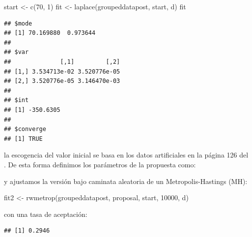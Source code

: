 \documentclass[
  12pt,
]{book}
\newenvironment{Shaded}{\begin{snugshade}}{\end{snugshade}}
\newcommand{\AttributeTok}[1]{\textcolor[rgb]{0.77,0.63,0.00}{#1}}
\newcommand{\DecValTok}[1]{\textcolor[rgb]{0.00,0.00,0.81}{#1}}
\newcommand{\FunctionTok}[1]{\textcolor[rgb]{0.00,0.00,0.00}{#1}}
\newcommand{\NormalTok}[1]{#1}
\newcommand{\OtherTok}[1]{\textcolor[rgb]{0.56,0.35,0.01}{#1}}
\newcommand{\SpecialCharTok}[1]{\textcolor[rgb]{0.00,0.00,0.00}{#1}}
\theoremstyle{definition}
\theoremstyle{definition}
\theoremstyle{definition}
\theoremstyle{definition}
\theoremstyle{remark}
\begin{document}
\begin{Shaded}
\begin{Highlighting}[]
\NormalTok{start }\OtherTok{\textless{}{-}} \FunctionTok{c}\NormalTok{(}\DecValTok{70}\NormalTok{, }\DecValTok{1}\NormalTok{)}
\NormalTok{fit }\OtherTok{\textless{}{-}} \FunctionTok{laplace}\NormalTok{(groupeddatapost, start, d)}
\NormalTok{fit}
\end{Highlighting}
\end{Shaded}

\begin{verbatim}
## $mode
## [1] 70.169880  0.973644
## 
## $var
##              [,1]         [,2]
## [1,] 3.534713e-02 3.520776e-05
## [2,] 3.520776e-05 3.146470e-03
## 
## $int
## [1] -350.6305
## 
## $converge
## [1] TRUE
\end{verbatim}

la escogencia del valor inicial se basa en los datos artificiales en la página 126 del \autocite{Albert2009}. De esta forma definimos los parámetros de la propuesta como:

\begin{Shaded}
\end{Shaded}

y ajustamos la versión bajo caminata aleatoria de un Metropolis-Hastings (MH):

\begin{Shaded}
\begin{Highlighting}[]
\NormalTok{fit2 }\OtherTok{\textless{}{-}} \FunctionTok{rwmetrop}\NormalTok{(groupeddatapost, proposal, start,}
    \DecValTok{10000}\NormalTok{, d)}
\end{Highlighting}
\end{Shaded}

con una tasa de aceptación:

\begin{Shaded}
\end{Shaded}

\begin{verbatim}
## [1] 0.2946
\end{verbatim}
\end{document}
